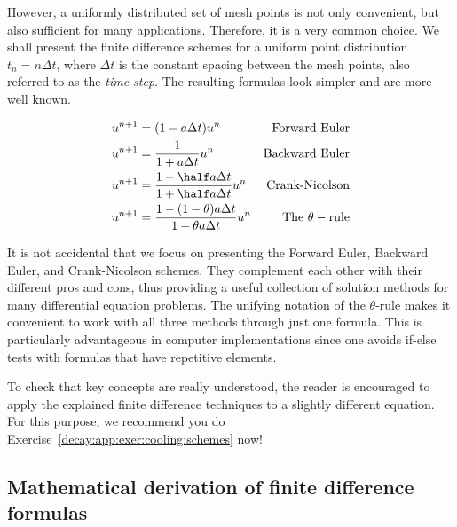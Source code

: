 \documentclass[graybox,sectrefs,envcountresetchap,open=right,final]{svmonodo}
\newenvironment{summary_mdfboxadmon}[1][]{
\begin{summary_mdfboxmdframed}[frametitle=#1]
}
{
\end{summary_mdfboxmdframed}
}
\newenvironment{question_mdfboxadmon}[1][]{
\begin{question_mdfboxmdframed}[frametitle=#1]
}
{
\end{question_mdfboxmdframed}
}
\begin{document}

However, a uniformly distributed set of mesh points is not only
convenient, but also
sufficient for many applications. Therefore, it is a very common
choice. We shall
present the finite difference schemes for a uniform point distribution
$t_n=n\Delta t$, where $\Delta t$ is the constant spacing between
the mesh points, also referred to as the \emph{time step}.
The resulting formulas look simpler and are more
well known.


\begin{summary_mdfboxadmon}
\begin{alignat}{2}
u^{n+1} &= (1 - a\Delta t )u^n  & \hbox{Forward Euler}
\label{decay:FE:u}\\ 
u^{n+1} &= \frac{1}{1+ a\Delta t} u^n  & \hbox{Backward Euler}
\label{decay:BE:u}\\ 
u^{n+1} &= \frac{1-\half a\Delta t}{1 + \half a\Delta t} u^n & \hbox{Crank-Nicolson}
\label{decay:CN:u}\\ 
u^{n+1} &= \frac{1 - (1-\theta) a\Delta t}{1 + \theta a \Delta t}u^n  & \hbox{The }\theta-\hbox{rule}
\label{decay:th:u}
\end{alignat}
\end{summary_mdfboxadmon}



It is not accidental that we focus on presenting the Forward Euler, Backward
Euler, and Crank-Nicolson schemes. They complement each other with their
different pros and cons, thus providing a useful collection of
solution methods for many differential equation problems.
The unifying notation of the $\theta$-rule makes it convenient to
work with all three methods through just one formula. This is
particularly advantageous in computer implementations since one avoids
if-else tests with formulas that have repetitive elements.


\begin{question_mdfboxadmon}
To check that key concepts are really understood, the reader is
encouraged to apply the explained finite difference techniques
to a slightly different equation. For this purpose, we recommend
you do Exercise~\ref{decay:app:exer:cooling:schemes} now!
\end{question_mdfboxadmon}



\subsection{Mathematical derivation of finite difference formulas}
\label{decay:fd:taylor}
\end{document}
